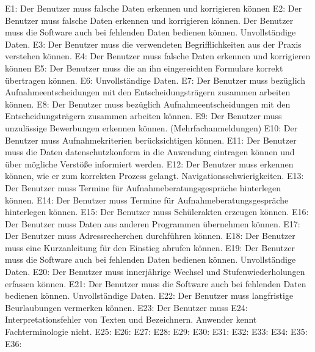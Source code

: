 E1: Der Benutzer muss falsche Daten erkennen und korrigieren können
E2: Der Benutzer muss falsche Daten erkennen und korrigieren können. Der Benutzer muss die Software auch bei fehlenden Daten bedienen können. Unvollständige Daten.
E3: Der Benutzer muss die verwendeten Begrifflichkeiten aus der Praxis verstehen können.
E4: Der Benutzer muss falsche Daten erkennen und korrigieren können
E5: Der Benutzer muss die an ihn eingereichten Formulare korrekt übertragen können.
E6: Unvollständige Daten.
E7: Der Benutzer muss bezüglich Aufnahmeentscheidungen mit den Entscheidungsträgern zusammen arbeiten können.
E8: Der Benutzer muss bezüglich Aufnahmeentscheidungen mit den Entscheidungsträgern zusammen arbeiten können.
E9: Der Benutzer muss unzulässige Bewerbungen erkennen können. (Mehrfachanmeldungen)
E10: Der Benutzer muss Aufnahmekriterien berücksichtigen können.
E11: Der Benutzer muss die Daten datenschutzkonform in die Anwendung eintragen können und über mögliche Verstöße informiert werden.
E12: Der Benutzer muss erkennen können, wie er zum korrekten Prozess gelangt. Navigationsschwierigkeiten.
E13: Der Benutzer muss Termine für Aufnahmeberatungsgespräche hinterlegen können.
E14: Der Benutzer muss Termine für Aufnahmeberatungsgespräche hinterlegen können.
E15: Der Benutzer muss Schülerakten erzeugen können.
E16: Der Benutzer muss Daten aus anderen Programmen übernehmen können.
E17: Der Benutzer muss Adressrecherchen durchführen können.
E18: Der Benutzer muss eine Kurzanleitung für den Einstieg abrufen können.
E19: Der Benutzer muss die Software auch bei fehlenden Daten bedienen können. Unvollständige Daten.
E20: Der Benutzer muss innerjährige Wechsel und Stufenwiederholungen erfassen können.
E21: Der Benutzer muss die Software auch bei fehlenden Daten bedienen können. Unvollständige Daten.
E22: Der Benutzer muss langfristige Beurlaubungen vermerken können.
E23: Der Benutzer muss 
E24: Interpretationsfehler von Texten und Bezeichnern. Anwender kennt Fachterminologie nicht.
E25:
E26:
E27:
E28:
E29:
E30:
E31:
E32:
E33:
E34:
E35:
E36:
